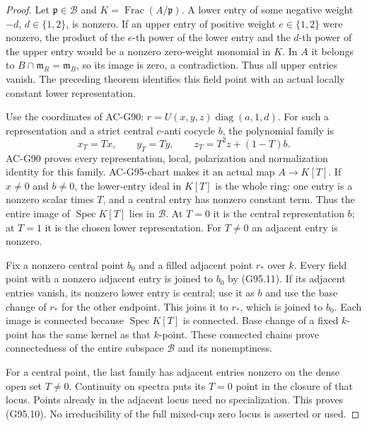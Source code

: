 \begin{proof}
Let \(\mathfrak p\in\mathcal B\) and
\(K=\operatorname{Frac}(A/\mathfrak p)\).
A lower entry of some negative weight \(-d\),
\(d\in\{1,2\}\), is nonzero.
If an upper entry of positive weight \(e\in\{1,2\}\)
were nonzero, the product of the \(e\)-th power of
the lower entry and the \(d\)-th power of the upper
entry would be a nonzero zero-weight monomial in \(K\).
In \(A\) it belongs to \(B\cap\mathfrak m_R=\mathfrak m_B\),
so its image is zero, a contradiction.
Thus all upper entries vanish.
The preceding theorem identifies this field point with
an actual locally constant lower representation.

Use the coordinates of AC-G90:
\(r=U(x,y,z)\operatorname{diag}(a,1,d)\).
For such a representation and a strict central
\(c\)-anti cocycle \(b\), the polynomial family is
\[
 x_T=Tx,\qquad y_T=Ty,\qquad z_T=T^2z+(1-T)b .
 \tag{G95.11}
\]
AC-G90 proves every representation, local, polarization
and normalization identity for this family.
AC-G95-chart makes it an actual map \(A\to K[T]\).
If \(x\ne0\) and \(b\ne0\), the lower-entry ideal in
\(K[T]\) is the whole ring: one entry is a nonzero
scalar times \(T\), and a central entry has nonzero
constant term.
Thus the entire image of \(\operatorname{Spec}K[T]\)
lies in \(\mathcal B\).
At \(T=0\) it is the central representation \(b\);
at \(T=1\) it is the chosen lower representation.
For \(T\ne0\) an adjacent entry is nonzero.

Fix a nonzero central point \(b_0\) and a filled adjacent
point \(r_*\) over \(k\).
Every field point with a nonzero adjacent entry is
joined to \(b_0\) by (G95.11).
If its adjacent entries vanish, its nonzero lower
entry is central; use it as \(b\) and use the base
change of \(r_*\) for the other endpoint.
This joins it to \(r_*\), which is joined to \(b_0\).
Each image is connected because
\(\operatorname{Spec}K[T]\) is connected.
Base change of a fixed \(k\)-point has the same kernel
as that \(k\)-point.
These connected chains prove connectedness of the
entire subspace \(\mathcal B\) and its nonemptiness.

For a central point, the last family has adjacent
entries nonzero on the dense open set \(T\ne0\).
Continuity on spectra puts its \(T=0\) point in the
closure of that locus.
Points already in the adjacent locus need no
specialization.  This proves (G95.10).
No irreducibility of the full mixed-cup zero locus
is asserted or used.
\end{proof}

